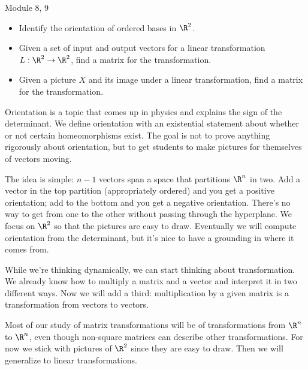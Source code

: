 \begin{lesson}

	Module 8, 9

	\begin{itemize}
		\item Identify the orientation of ordered bases in $\R^2$.
		\item Given a set of input and output vectors for a
			linear transformation $L:\R^2\to\R^2$, find
			a matrix for the transformation.
		\item Given a picture $X$ and its image under a linear transformation,
			find a matrix for the transformation.
	\end{itemize}

	Orientation is a topic that comes up in physics and explains the sign
	of the determinant. We define orientation with an existential statement
	about whether or not certain homeomorphisms exist. The goal is not to
	prove anything rigorously about orientation, but to get students to
	make pictures for themselves of vectors moving.

	The idea is simple: $n-1$ vectors span a space that partitions $\R^n$ in
	two. Add a vector in the top partition (appropriately ordered) and you get
	a positive orientation; add to the bottom and you get a negative orientation.
	There's no way to get from one to the other without passing through the
	hyperplane. We focus on $\R^2$ so that the pictures are easy to draw.
	Eventually we will compute orientation from the determinant, but it's nice
	to have a grounding in where it comes from.

	While we're thinking dynamically, we can start thinking about transformation.
	We already know how to multiply a matrix and a vector and interpret it in
	two different ways. Now we will add a third: multiplication by a given
	matrix is a transformation from vectors to vectors.

	Most of our study of matrix transformations will be of transformations from $\R^n$
	to $\R^n$, even though non-square matrices can describe other transformations.
	For now we stick with pictures of $\R^2$ since they are easy to draw. Then
	we will generalize to linear transformations.

\end{lesson}

	\bookonlynewpage

